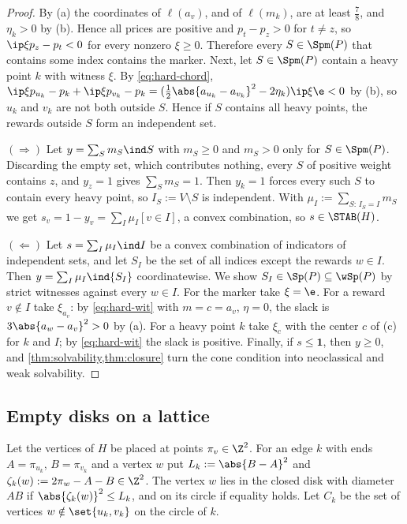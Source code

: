 \begin{proof}
By (a) the coordinates of $\ell(a_v)$, and of $\ell(m_k)$, are at least $\frac78$, and $\eta_k>0$ by (b). Hence all prices are positive and $p_t-p_z>0$ for $t\ne z$, so $\ip\xi{p_z-p_t}<0$ for every nonzero $\xi\ge0$. Therefore every $S\in\Spm(P)$ that contains some index contains the marker. Next, let $S\in\Spm(P)$ contain a heavy point $k$ with witness $\xi$. By \eqref{eq:hard-chord}, $\ip\xi{p_{u_k}-p_k}+\ip\xi{p_{v_k}-p_k}=(\frac12\abs{a_{u_k}-a_{v_k}}^2-2\eta_k)\ip\xi\e<0$ by (b), so $u_k$ and $v_k$ are not both outside $S$. Hence if $S$ contains all heavy points, the rewards outside $S$ form an independent set.

$(\Rightarrow)$ Let $y=\sum_Sm_S\ind S$ with $m_S\ge0$ and $m_S>0$ only for $S\in\Spm(P)$. Discarding the empty set, which contributes nothing, every $S$ of positive weight contains $z$, and $y_z=1$ gives $\sum_Sm_S=1$. Then $y_k=1$ forces every such $S$ to contain every heavy point, so $I_S:=V\setminus S$ is independent. With $\mu_I:=\sum_{S:\,I_S=I}m_S$ we get $s_v=1-y_v=\sum_I\mu_I[v\in I]$, a convex combination, so $s\in\STAB(H)$.

$(\Leftarrow)$ Let $s=\sum_I\mu_I\ind I$ be a convex combination of indicators of independent sets, and let $S_I$ be the set of all indices except the rewards $w\in I$. Then $y=\sum_I\mu_I\ind{S_I}$ coordinatewise. We show $S_I\in\Sp(P)\subseteq\wSp(P)$ by strict witnesses against every $w\in I$. For the marker take $\xi=\e$. For a reward $v\notin I$ take $\xi_{a_v}$: by \eqref{eq:hard-wit} with $m=c=a_v$, $\eta=0$, the slack is $3\abs{a_w-a_v}^2>0$ by (a). For a heavy point $k$ take $\xi_c$ with the center $c$ of (c) for $k$ and $I$; by \eqref{eq:hard-wit} the slack is positive. Finally, if $s\le\mathbf 1$, then $y\ge0$, and \cref{thm:solvability,thm:closure} turn the cone condition into neoclassical and weak solvability.
\end{proof}

\subsection{Empty disks on a lattice}\label{sec:disks}

Let the vertices of $H$ be placed at points $\pi_v\in\Z^2$. For an edge $k$ with ends $A=\pi_{u_k}$, $B=\pi_{v_k}$ and a vertex $w$ put $L_k:=\abs{B-A}^2$ and $\zeta_k(w):=2\pi_w-A-B\in\Z^2$. The vertex $w$ lies in the closed disk with diameter $AB$ if $\abs{\zeta_k(w)}^2\le L_k$, and on its circle if equality holds. Let $C_k$ be the set of vertices $w\notin\set{u_k,v_k}$ on the circle of $k$.


